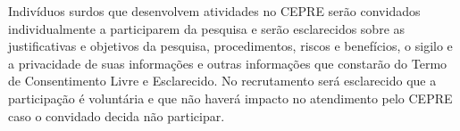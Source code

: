 \documentclass[a4paper,11pt,titlepage,singlespacing]{article}
\begin{document}
Indivíduos surdos que desenvolvem atividades no CEPRE serão convidados individualmente a participarem da pesquisa e serão esclarecidos sobre as justificativas e objetivos da pesquisa, procedimentos, riscos e benefícios, o sigilo e a privacidade de suas informações e outras informações que constarão do Termo de Consentimento Livre e Esclarecido. No recrutamento será esclarecido que a participação é voluntária e que não haverá impacto no atendimento pelo CEPRE caso o convidado decida não participar.









\end{document}
